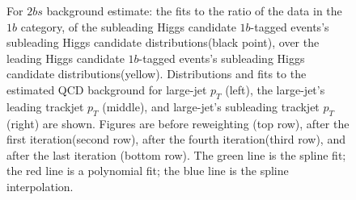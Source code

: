 \begin{figure}[htbp!]
\begin{center}
\caption{For $2bs$ background estimate: the fits to the ratio of the data in the $1b$ category, of the subleading Higgs candidate $1b$-tagged events's subleading Higgs candidate distributions(black point), over the leading Higgs candidate $1b$-tagged events's subleading Higgs candidate distributions(yellow). Distributions and fits to the estimated QCD background for large-\R jet $p_{T}$ (left), the large-\R jet's leading trackjet $p_T$ (middle), and large-\R jet's subleading trackjet $p_T$ (right) are shown.  Figures are before reweighting (top row), after the first iteration(second row), after the fourth iteration(third row), and after the last iteration (bottom row). The green line is the spline fit; the red line is a polynomial fit; the blue line is the spline interpolation.}
\label{fig:rw-2bs-lead}
\end{center}
\end{figure}

